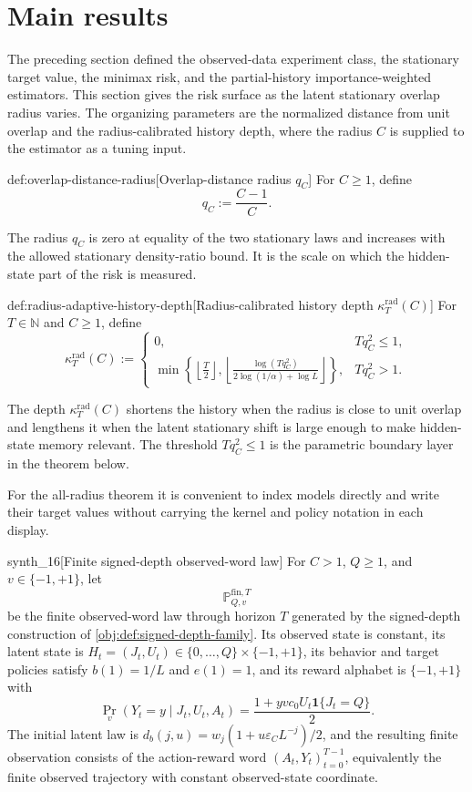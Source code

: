 \documentclass[11pt]{article}
\begin{document}
\section{Main results}

The preceding section defined the observed-data experiment class, the stationary target value, the minimax risk, and the partial-history importance-weighted estimators. This section gives the risk surface as the latent stationary overlap radius varies. The organizing parameters are the normalized distance from unit overlap and the radius-calibrated history depth, where the radius \(C\) is supplied to the estimator as a tuning input.

\begin{definitionv}{def:overlap-distance-radius}[Overlap-distance radius \(q_C\)]
For \(C\ge 1\), define
\[
q_C:=\frac{C-1}{C}.
\]
\end{definitionv}

The radius \(q_C\) is zero at equality of the two stationary laws and increases with the allowed stationary density-ratio bound. It is the scale on which the hidden-state part of the risk is measured.

\begin{definitionv}{def:radius-adaptive-history-depth}[Radius-calibrated history depth \(\kappa_T^{\mathrm{rad}}(C)\)]
For \(T\in\mathbb N\) and \(C\ge 1\), define
\[
\kappa_T^{\mathrm{rad}}(C):=
\begin{cases}
0, & Tq_C^2\le 1,\\[3pt]
\displaystyle
\min\!\left\{
\left\lfloor\frac T2\right\rfloor,
\left\lfloor\frac{\log(Tq_C^2)}{2\log(1/\alpha)+\log L}\right\rfloor
\right\},
& Tq_C^2>1.
\end{cases}
\]
\end{definitionv}

The depth \(\kappa_T^{\mathrm{rad}}(C)\) shortens the history when the radius is close to unit overlap and lengthens it when the latent stationary shift is large enough to make hidden-state memory relevant. The threshold \(Tq_C^2\le1\) is the parametric boundary layer in the theorem below.

For the all-radius theorem it is convenient to index models directly and write their target values without carrying the kernel and policy notation in each display.

\begin{definitionv}{synth_16}[Finite signed-depth observed-word law]
For \(C>1\), \(Q\ge1\), and \(v\in\{-1,+1\}\), let
\[
\mathbb P_{Q,v}^{\mathrm{fin},T}
\]
be the finite observed-word law through horizon \(T\) generated by the signed-depth construction of \cref{obj:def:signed-depth-family}. Its observed state is constant, its latent state is \(H_t=(J_t,U_t)\in\{0,\ldots,Q\}\times\{-1,+1\}\), its behavior and target policies satisfy \(b(1)=1/L\) and \(e(1)=1\), and its reward alphabet is \(\{-1,+1\}\) with
\[
\Pr_v(Y_t=y\mid J_t,U_t,A_t)
=
\frac{1+yvc_0U_t\mathbf 1\{J_t=Q\}}{2}.
\]
The initial latent law is \(d_b(j,u)=w_j(1+u\varepsilon_C L^{-j})/2\), and the resulting finite observation consists of the action-reward word \((A_t,Y_t)_{t=0}^{T-1}\), equivalently the finite observed trajectory with constant observed-state coordinate.
\end{definitionv}
\end{document}
